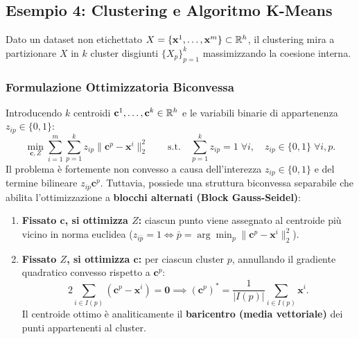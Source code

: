 \subsection{Esempio 4: Clustering e Algoritmo K-Means}
Dato un dataset non etichettato $X = \{\mathbf{x}^1, \dots, \mathbf{x}^m\} \subset \mathbb{R}^h$, il clustering mira a partizionare $X$ in $k$ cluster disgiunti $\{X_p\}_{p=1}^k$ massimizzando la coesione interna.

\subsubsection{Formulazione Ottimizzatoria Biconvessa}
Introducendo $k$ centroidi $\mathbf{c}^1, \dots, \mathbf{c}^k \in \mathbb{R}^h$ e le variabili binarie di appartenenza $z_{ip} \in \{0, 1\}$:
\begin{equation}
    \min_{\mathbf{c}, Z} \sum_{i=1}^m \sum_{p=1}^k z_{ip} \|\mathbf{c}^p - \mathbf{x}^i\|_2^2 \qquad \text{s.t.} \quad \sum_{p=1}^k z_{ip} = 1 \; \forall i, \quad z_{ip} \in \{0, 1\} \; \forall i,p.
\end{equation}
Il problema \`e fortemente non convesso a causa dell'interezza $z_{ip} \in \{0, 1\}$ e del termine bilineare $z_{ip}\mathbf{c}^p$. Tuttavia, possiede una struttura biconvessa separabile che abilita l'ottimizzazione a \textbf{blocchi alternati (Block Gauss-Seidel)}:
\begin{enumerate}
    \item \textbf{Fissato $\mathbf{c}$, si ottimizza $Z$:} ciascun punto viene assegnato al centroide pi\`u vicino in norma euclidea ($z_{i\bar{p}} = 1 \iff \bar{p} = \arg\min_p \|\mathbf{c}^p - \mathbf{x}^i\|_2^2$).
    \item \textbf{Fissato $Z$, si ottimizza $\mathbf{c}$:} per ciascun cluster $p$, annullando il gradiente quadratico convesso rispetto a $\mathbf{c}^p$:
    \begin{equation}
        2 \sum_{i \in I(p)} (\mathbf{c}^p - \mathbf{x}^i) = \mathbf{0} \implies (\mathbf{c}^p)^* = \frac{1}{|I(p)|} \sum_{i \in I(p)} \mathbf{x}^i.
    \end{equation}
    Il centroide ottimo \`e analiticamente il \textbf{baricentro (media vettoriale)} dei punti appartenenti al cluster.
\end{enumerate}


